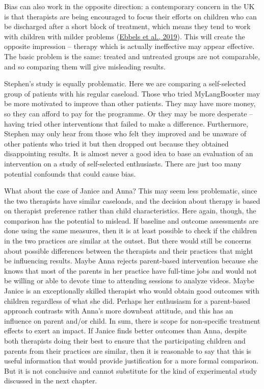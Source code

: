 \documentclass{krantz}
\begin{document}
Bias can also work in the opposite direction: a contemporary concern in the UK is that therapists are being encouraged to focus their efforts on children who can be discharged after a short block of treatment, which means they tend to work with children with milder problems (\protect\hyperlink{ref-ebbels2019}{Ebbels et al., 2019}). This will create the opposite impression -- therapy which is actually ineffective may appear effective. The basic problem is the same: treated and untreated groups are not comparable, and so comparing them will give misleading results.

Stephen's study is equally problematic. Here we are comparing a self-selected group of patients with his regular caseload. Those who tried MyLangBooster may be more motivated to improve than other patients. They may have more money, so they can afford to pay for the programme. Or they may be more desperate -- having tried other interventions that failed to make a difference. Furthermore, Stephen may only hear from those who felt they improved and be unaware of other patients who tried it but then dropped out because they obtained disappointing results. It is almost never a good idea to base an evaluation of an intervention on a study of self-selected enthusiasts. There are just too many potential confounds that could cause bias.

What about the case of Janice and Anna? This may seem less problematic, since the two therapists have similar caseloads, and the decision about therapy is based on therapist preference rather than child characteristics. Here again, though, the comparison has the potential to mislead. If baseline and outcome assessments are done using the same measures, then it is at least possible to check if the children in the two practices are similar at the outset. But there would still be concerns about possible differences between the therapists and their practices that might be influencing results. Maybe Anna rejects parent-based intervention because she knows that most of the parents in her practice have full-time jobs and would not be willing or able to devote time to attending sessions to analyze videos. Maybe Janice is an exceptionally skilled therapist who would obtain good outcomes with children regardless of what she did. Perhaps her enthusiasm for a parent-based approach contrasts with Anna's more downbeat attitude, and this has an influence on parent and/or child. In sum, there is scope for non-specific treatment effects to exert an impact. If Janice finds better outcomes than Anna, despite both therapists doing their best to ensure that the participating children and parents from their practices are similar, then it is reasonable to say that this is useful information that would provide justification for a more formal comparison. But it is not conclusive and cannot substitute for the kind of experimental study discussed in the next chapter.
\end{document}
